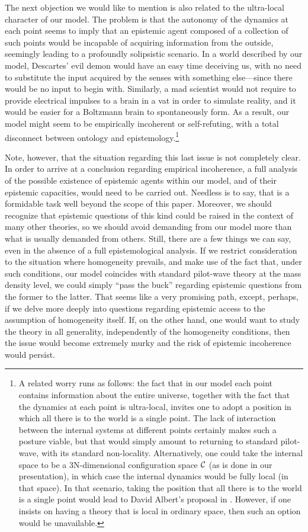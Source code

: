 \documentclass[letterpaper,12pt]{article}
\begin{document}
The next objection we would like to mention is also related to the ultra-local character of our model. The problem is that the autonomy of the dynamics at each point seems to imply that an epistemic agent composed of a collection of such points would be incapable of acquiring information from the outside, seemingly leading to a profoundly solipsistic scenario. In a world described by our model, Descartes' evil demon would have an easy time deceiving us, with no need to substitute the input acquired by the senses with something else---since there would be no input to begin with. Similarly, a mad scientist would not require to provide electrical impulses to a brain in a vat in order to simulate reality, and it would be easier for a Boltzmann brain to spontaneously form. As a result, our model might seem to be empirically incoherent or self-refuting, with a total disconnect between ontology and epistemology.\footnote{A related worry runs as follows: the fact that in our model each point contains information about the entire universe, together with the fact that the dynamics at each point is ultra-local, invites one to adopt a position in which all there is to the world is a single point. The lack of interaction between the internal systems at different points certainly makes such a posture viable, but that would simply amount to returning to standard pilot-wave, with its standard non-locality. Alternatively, one could take the internal space to be a 3N-dimensional configuration space ${\cal C} $ (as is done in our presentation), in which case the internal dynamics would be fully local (in that space). In that scenario, taking the position that all there is to the world is a single point would lead to David Albert's proposal in \cite{Albert}. However, if one insists on having a theory that is local in ordinary space, then such an option would be unavailable.} 

Note, however, that the situation regarding this last issue is not completely clear. In order to arrive at a conclusion regarding empirical incoherence, a full analysis of the possible existence of epistemic agents within our model, and of their epistemic capacities, would need to be carried out. Needless is to say, that is a formidable task well beyond the scope of this paper. Moreover, we should recognize that epistemic questions of this kind could be raised in the context of many other theories, so we should avoid demanding from our model more than what is usually demanded from others. Still, there are a few things we can say, even in the absence of a full epistemological analysis. If we restrict consideration to the situation where homogeneity prevails, and make use of the fact that, under such conditions, our model coincides with standard pilot-wave theory at the mass density level, we could simply ``pass the buck'' regarding epistemic questions from the former to the latter. That seems like a very promising path, except, perhaps, if we delve more deeply into questions regarding epistemic access to the assumption of homogeneity itself. If, on the other hand, one would want to study the theory in all generality, independently of the homogeneity conditions, then the issue would become extremely murky and the risk of epistemic incoherence would persist.
 
\end{document}
